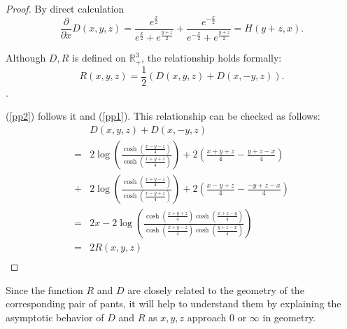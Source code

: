  \begin{proof}
 By direct calculation $$\frac{\partial}{\partial x}D(x,y,z)=\frac{e^{\frac{x}{2}}}{e^{\frac{x}{2}}+e^{\frac{y+z}{2}}}+ \frac{e^{-\frac{x}{2}}}{e^{-\frac{x}{2}}+e^{\frac{y+z}{2}}}=H(y+z,x).$$
 
  Although $D,R$ is defined on $\mathbb{R}_+^3$,   the relationship holds formally:
    \begin{equation}\label{RDD}
       R(x,y,z)=\frac{1}{2}( D(x,y,z)+D(x,-y,z)).
    \end{equation}.
    
    (\ref{pp2}) follows it and (\ref{pp1}).
    This relationship can be checked as follows:
    $$
    \begin{aligned}
    &D(x,y,z)+D(x,-y,z)\\
    =&2\log\left(\frac{\cosh(\frac{x-y-z}{4})}{\cosh(\frac{x+y+z}{4})}\right)+2\left(\frac{x+y+z}{4}-\frac{y+z-x}{4}\right)        \\
    +& 2\log\left(\frac{\cosh(\frac{x+y-z}{4})}{\cosh(\frac{x-y+z}{4})}\right) +2\left(\frac{x-y+z}{4}-\frac{-y+z-x}{4}\right)          \\
    =&2x-2\log\left(\frac{   \cosh(\frac{x+y+z}{4})\cosh(\frac{x+z-y}{4})          }{  \cosh(\frac{x+y-z}{4})\cosh(\frac{y+z-x}{4})            }\right)\\
    =&2R(x,y,z)\\
    \end{aligned}
    $$
    
 \end{proof}
 
 \begin{remark}
 Since the function $R$ and $D$ are closely related to the geometry of the corresponding pair of pants, it will help to understand them by explaining  the  asymptotic behavior of $D$ and $R$ as $x,y,z$ approach $0$ or $\infty$ in geometry.
 \end{remark}
 
